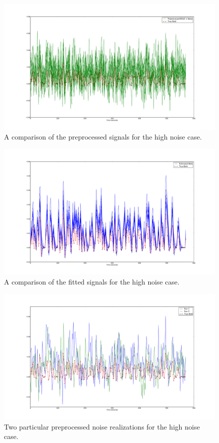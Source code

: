 \begin{figure}
\includegraphics[clip=true,trim=6cm 2cm 5cm 3.5cm,width=15cm]{images/preprocessed_highnoise}
\caption{A comparison of the preprocessed signals for the high noise case.}
\label{fig:PreprocessedHighNoise}
\end{figure}

\begin{figure}
\includegraphics[clip=true,trim=6cm 2cm 5cm 3.5cm,width=15cm]{images/comparison_highnoise}
\caption{A comparison of the fitted signals for the high noise case.}
\label{fig:FitComparisonHighNoise}
\end{figure}

\begin{figure}
\includegraphics[clip=true,trim=6cm 2cm 5cm 3.5cm,width=15cm]{images/highnoise_56_noise}
\caption{Two particular preprocessed noise realizations for the high noise case.}
\label{fig:NoiseComparisonJustTwo}
\end{figure}

